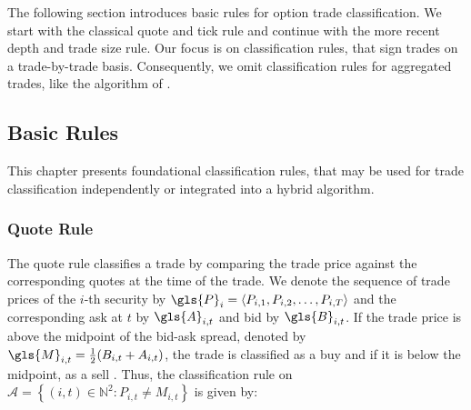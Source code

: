 
The following section introduces basic rules for option trade classification. We start with the classical quote and tick rule and continue with the more recent depth and trade size rule. Our focus is on classification rules, that sign trades on a trade-by-trade basis. Consequently, we omit classification rules for aggregated trades, like the  algorithm of \textcite[][1466--1468]{easleyFlowToxicityLiquidity2012}.

\subsection{Basic Rules}\label{sec:basic-rules}

This chapter presents foundational classification rules, that may be used for trade classification independently or integrated into a hybrid algorithm.

\subsubsection{Quote Rule}\label{sec:quote-rule}

The quote rule classifies a trade by comparing the trade price against the corresponding quotes at the time of the trade. We denote the sequence of trade prices of the $i$-th security by $\gls{P}_i = \langle P_{i,1},P_{i,2},\dots,P_{i,T}\rangle$ and the corresponding ask at $t$ by $\gls{A}_{i,t}$ and bid by $\gls{B}_{i,t}$. If the trade price is above the midpoint of the bid-ask spread, denoted by $\gls{M}_{i,t} = \tfrac{1}{2}(B_{i,t} + A_{i,t})$, the trade is classified as a buy and if it is below the midpoint, as a sell \autocite[][41]{harrisDayEndTransactionPrice1989}. Thus, the classification rule on $\mathcal{A} = \left\{(i, t) \in \mathbb{N}^2: P_{i,t} \neq M_{i,t}\right\}$ is given by:

